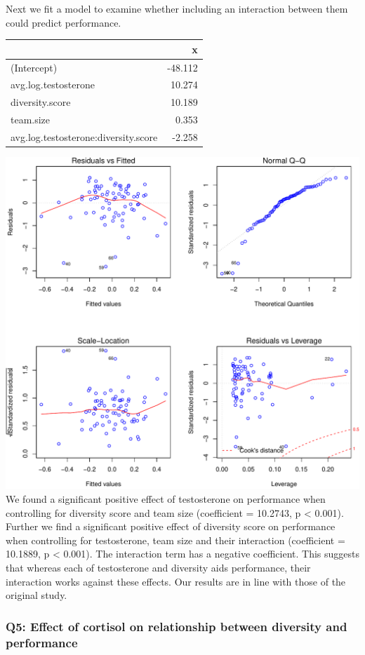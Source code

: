 \documentclass[]{article}
\begin{document}
Next we fit a model to examine whether including an interaction between
them could predict performance.

\begin{longtable}[]{@{}lr@{}}
\toprule
& x\tabularnewline
\midrule
\endhead
(Intercept) & -48.112\tabularnewline
avg.log.testosterone & 10.274\tabularnewline
diversity.score & 10.189\tabularnewline
team.size & 0.353\tabularnewline
avg.log.testosterone:diversity.score & -2.258\tabularnewline
\bottomrule
\end{longtable}

\includegraphics{19_10_02_hw5_q1_files/figure-latex/test_model-1.pdf} We
found a significant positive effect of testosterone on performance when
controlling for diversity score and team size (coefficient = 10.2743, p
\textless{} 0.001). Further we find a significant positive effect of
diversity score on performance when controlling for testosterone, team
size and their interaction (coefficient = 10.1889, p \textless{} 0.001).
The interaction term has a negative coefficient. This suggests that
whereas each of testosterone and diversity aids performance, their
interaction works against these effects. Our results are in line with
those of the original study.

\hypertarget{q5-effect-of-cortisol-on-relationship-between-diversity-and-performance}{%
\subsubsection{Q5: Effect of cortisol on relationship between diversity
and
performance}\label{q5-effect-of-cortisol-on-relationship-between-diversity-and-performance}}
\end{document}
